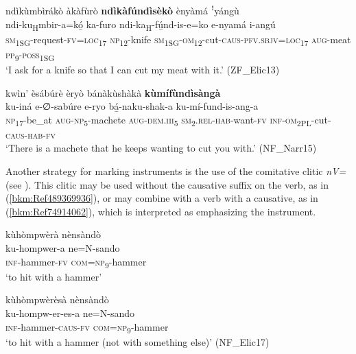 \newpage
\ea
\label{bkm:Ref488917150}
ndìkùmbìrákò àkàfùrò \textbf{ndìkàfúndìsèkò} ènyàmá ꜝyángù\\
\gll ndi-ku\textsubscript{H}mbir-a=kó̲    ka-furo  ndi-ka\textsubscript{H}-fú̲nd-is-e=ko e-nyamá  i-angú\\
\textsc{sm}\textsubscript{1SG}-request-\textsc{fv}=\textsc{loc}\textsubscript{17}  \textsc{np}\textsubscript{12}-knife  \textsc{sm}\textsubscript{1SG}-\textsc{om}\textsubscript{12}-cut-\textsc{caus}-\textsc{pfv}.\textsc{sbjv}=\textsc{loc}\textsubscript{17}
\textsc{aug}-meat  \textsc{pp}\textsubscript{9}-\textsc{poss}\textsubscript{1SG}\\
\glt ‘I ask for a knife so that I can cut my meat with it.’ (ZF\_Elic13)
\z

\ea
\label{bkm:Ref488917152}
kwìn’ èsábúrè èryò bánàkùshàkà \textbf{kùmífùndìsàngà}\\
\gll ku-iná  e-∅-sabúre e-ryo    bá̲-naku-shak-a    ku-mí-fund-is-ang-a\\
\textsc{np}\textsubscript{17}-be\_at  \textsc{aug}-\textsc{np}\textsubscript{5}-machete
\textsc{aug}-\textsc{dem}.\textsc{iii}\textsubscript{5}  \textsc{sm}\textsubscript{2}.\textsc{rel}-\textsc{hab}-want-\textsc{fv}  \textsc{inf}-\textsc{om}\textsubscript{2PL}-cut-\textsc{caus}-\textsc{hab}-\textsc{fv}\\
\glt ‘There is a machete that he keeps wanting to cut you with.’ (NF\_Narr15)
\z

Another strategy for marking instruments is the use of the comitative clitic \textit{nV=} (see ). This clitic may be used without the causative suffix on the verb, as in (\ref{bkm:Ref489369936}), or may combine with a verb with a causative, as in (\ref{bkm:Ref74914062}), which is interpreted as emphasizing the instrument.

\ea
\label{bkm:Ref489369936}
kùhòmpwèrà nènsàndò\\
\gll ku-hompwer-a  ne=N-sando\\
\textsc{inf}-hammer-\textsc{fv}  \textsc{com}=\textsc{np}\textsubscript{9}-hammer\\
\glt ‘to hit with a hammer’
\z

\ea
\label{bkm:Ref74914062}
kùhòmpwèrèsà nènsàndò\\
\gll ku-hompw-er-es-a    ne=N-sando\\
\textsc{inf}-hammer-\textsc{caus}-\textsc{fv}  \textsc{com}=\textsc{np}\textsubscript{9}-hammer\\
\glt ‘to hit with a hammer (not with something else)’ (NF\_Elic17)
\z

